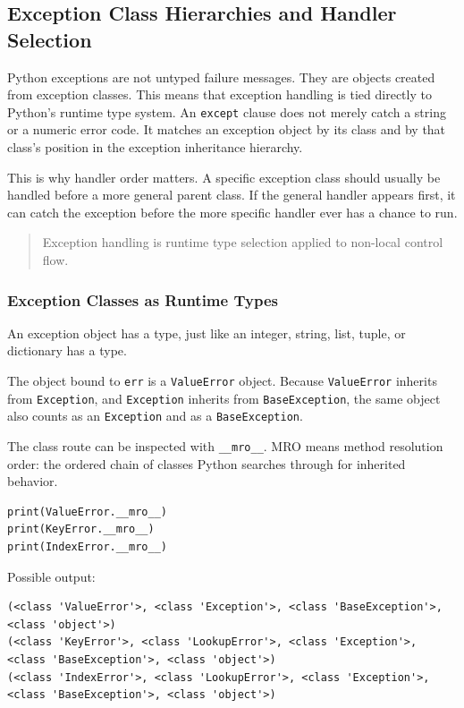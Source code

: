 \subsection{Exception Class Hierarchies and Handler Selection}

Python exceptions are not untyped failure messages. They are objects created from exception classes. This means that exception handling is tied directly to Python's runtime type system. An \texttt{except} clause does not merely catch a string or a numeric error code. It matches an exception object by its class and by that class's position in the exception inheritance hierarchy.

This is why handler order matters. A specific exception class should usually be handled before a more general parent class. If the general handler appears first, it can catch the exception before the more specific handler ever has a chance to run.

\begin{quote}
Exception handling is runtime type selection applied to non-local control flow.
\end{quote}

\subsubsection{Exception Classes as Runtime Types}

An exception object has a type, just like an integer, string, list, tuple, or dictionary has a type.

The object bound to \texttt{err} is a \texttt{ValueError} object. Because \texttt{ValueError} inherits from \texttt{Exception}, and \texttt{Exception} inherits from \texttt{BaseException}, the same object also counts as an \texttt{Exception} and as a \texttt{BaseException}.

The class route can be inspected with \texttt{\_\_mro\_\_}. MRO means method resolution order: the ordered chain of classes Python searches through for inherited behavior.

\begin{verbatim}
print(ValueError.__mro__)
print(KeyError.__mro__)
print(IndexError.__mro__)
\end{verbatim}

Possible output:

\begin{verbatim}
(<class 'ValueError'>, <class 'Exception'>, <class 'BaseException'>, <class 'object'>)
(<class 'KeyError'>, <class 'LookupError'>, <class 'Exception'>, <class 'BaseException'>, <class 'object'>)
(<class 'IndexError'>, <class 'LookupError'>, <class 'Exception'>, <class 'BaseException'>, <class 'object'>)
\end{verbatim}

